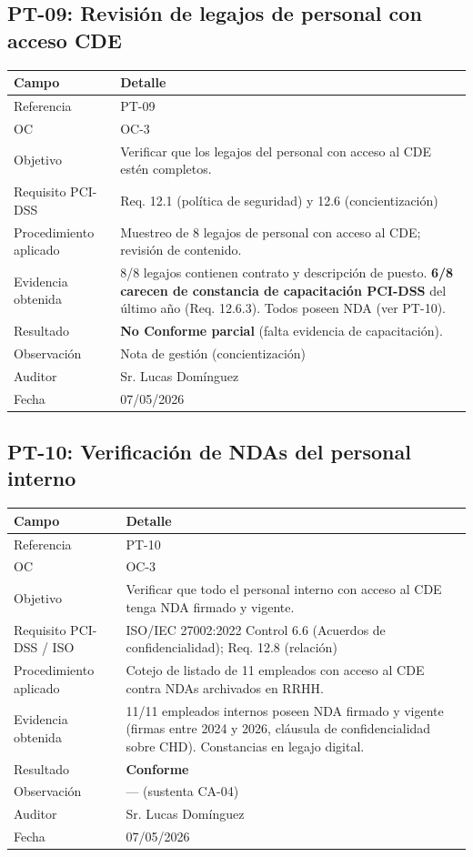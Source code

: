 \documentclass[11pt,a4paper]{article}
\begin{document}
\subsection{PT-09: Revisión de legajos de personal con acceso CDE}

\begin{tabularx}{\textwidth}{P{5cm}L}
\toprule
\textbf{Campo} & \textbf{Detalle} \\
\midrule
Referencia & PT-09 \\
OC & OC-3 \\
Objetivo & Verificar que los legajos del personal con acceso al CDE estén completos. \\
Requisito PCI-DSS & Req. 12.1 (política de seguridad) y 12.6 (concientización) \\
Procedimiento aplicado & Muestreo de 8 legajos de personal con acceso al CDE; revisión de contenido. \\
Evidencia obtenida & 8/8 legajos contienen contrato y descripción de puesto. \textbf{6/8 carecen de constancia de capacitación PCI-DSS} del último año (Req. 12.6.3). Todos poseen NDA (ver PT-10). \\
Resultado & \textbf{No Conforme parcial} (falta evidencia de capacitación). \\
Observación & Nota de gestión (concientización) \\
Auditor & Sr. Lucas Domínguez \\
Fecha & 07/05/2026 \\
\bottomrule
\end{tabularx}

\subsection{PT-10: Verificación de NDAs del personal interno}

\begin{tabularx}{\textwidth}{P{5cm}L}
\toprule
\textbf{Campo} & \textbf{Detalle} \\
\midrule
Referencia & PT-10 \\
OC & OC-3 \\
Objetivo & Verificar que todo el personal interno con acceso al CDE tenga NDA firmado y vigente. \\
Requisito PCI-DSS / ISO & ISO/IEC 27002:2022 Control 6.6 (Acuerdos de confidencialidad); Req. 12.8 (relación) \\
Procedimiento aplicado & Cotejo de listado de 11 empleados con acceso al CDE contra NDAs archivados en RRHH. \\
Evidencia obtenida & 11/11 empleados internos poseen NDA firmado y vigente (firmas entre 2024 y 2026, cláusula de confidencialidad sobre CHD). Constancias en legajo digital. \\
Resultado & \textbf{Conforme} \\
Observación & — (sustenta CA-04) \\
Auditor & Sr. Lucas Domínguez \\
Fecha & 07/05/2026 \\
\bottomrule
\end{tabularx}
\end{document}
